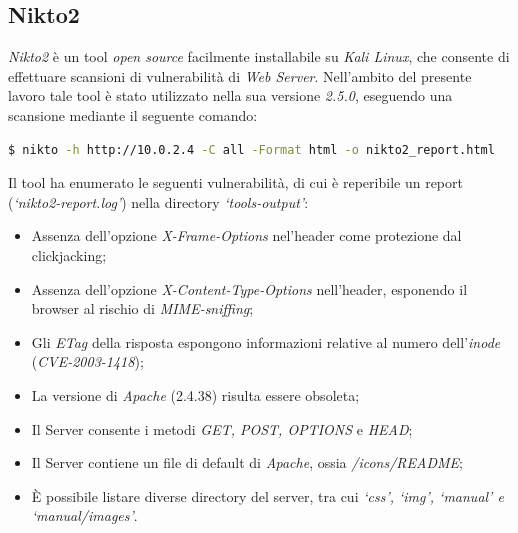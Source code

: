 \subsection{Nikto2}
\emph{Nikto2} è un tool \emph{open source} facilmente installabile su \emph{Kali Linux}, che consente di effettuare scansioni di vulnerabilità di \emph{Web Server}. Nell'ambito del presente lavoro tale tool è stato utilizzato nella sua versione \emph{2.5.0}, eseguendo una scansione mediante il seguente comando:
\begin{lstlisting}[language=bash]
    $ nikto -h http://10.0.2.4 -C all -Format html -o nikto2_report.html
\end{lstlisting}
Il tool ha enumerato le seguenti vulnerabilità, di cui è reperibile un report (\emph{`nikto2-report.log'}) nella directory \emph{`tools-output'}:
\begin{itemize}
    \item Assenza dell'opzione \emph{X-Frame-Options} nel'header come protezione dal clickjacking;
    \item Assenza dell'opzione \emph{X-Content-Type-Options} nell'header, esponendo il browser al rischio di \emph{MIME-sniffing};
    \item Gli \emph{ETag} della risposta espongono informazioni relative al numero dell'\emph{inode} (\emph{CVE-2003-1418});
    \item La versione di \emph{Apache} (2.4.38) risulta essere obsoleta;
    \item Il Server consente i metodi \emph{GET, POST, OPTIONS} e \emph{HEAD};
    \item Il Server contiene un file di default di \emph{Apache}, ossia \emph{/icons/README};
    \item È possibile listare diverse directory del server, tra cui \emph{`css', `img', `manual' e `manual/images'}.
\end{itemize}
